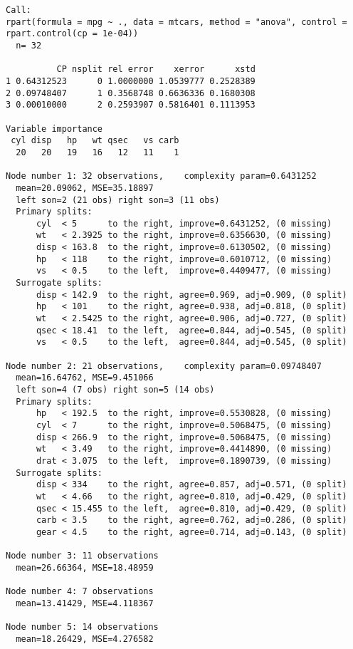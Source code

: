\documentclass[
  letterpaper,
  DIV=11,
  numbers=noendperiod]{scrreprt}
\begin{document}
\begin{verbatim}
Call:
rpart(formula = mpg ~ ., data = mtcars, method = "anova", control = rpart.control(cp = 1e-04))
  n= 32 

          CP nsplit rel error    xerror      xstd
1 0.64312523      0 1.0000000 1.0539777 0.2528389
2 0.09748407      1 0.3568748 0.6636336 0.1680308
3 0.00010000      2 0.2593907 0.5816401 0.1113953

Variable importance
 cyl disp   hp   wt qsec   vs carb 
  20   20   19   16   12   11    1 

Node number 1: 32 observations,    complexity param=0.6431252
  mean=20.09062, MSE=35.18897 
  left son=2 (21 obs) right son=3 (11 obs)
  Primary splits:
      cyl  < 5      to the right, improve=0.6431252, (0 missing)
      wt   < 2.3925 to the right, improve=0.6356630, (0 missing)
      disp < 163.8  to the right, improve=0.6130502, (0 missing)
      hp   < 118    to the right, improve=0.6010712, (0 missing)
      vs   < 0.5    to the left,  improve=0.4409477, (0 missing)
  Surrogate splits:
      disp < 142.9  to the right, agree=0.969, adj=0.909, (0 split)
      hp   < 101    to the right, agree=0.938, adj=0.818, (0 split)
      wt   < 2.5425 to the right, agree=0.906, adj=0.727, (0 split)
      qsec < 18.41  to the left,  agree=0.844, adj=0.545, (0 split)
      vs   < 0.5    to the left,  agree=0.844, adj=0.545, (0 split)

Node number 2: 21 observations,    complexity param=0.09748407
  mean=16.64762, MSE=9.451066 
  left son=4 (7 obs) right son=5 (14 obs)
  Primary splits:
      hp   < 192.5  to the right, improve=0.5530828, (0 missing)
      cyl  < 7      to the right, improve=0.5068475, (0 missing)
      disp < 266.9  to the right, improve=0.5068475, (0 missing)
      wt   < 3.49   to the right, improve=0.4414890, (0 missing)
      drat < 3.075  to the left,  improve=0.1890739, (0 missing)
  Surrogate splits:
      disp < 334    to the right, agree=0.857, adj=0.571, (0 split)
      wt   < 4.66   to the right, agree=0.810, adj=0.429, (0 split)
      qsec < 15.455 to the left,  agree=0.810, adj=0.429, (0 split)
      carb < 3.5    to the right, agree=0.762, adj=0.286, (0 split)
      gear < 4.5    to the right, agree=0.714, adj=0.143, (0 split)

Node number 3: 11 observations
  mean=26.66364, MSE=18.48959 

Node number 4: 7 observations
  mean=13.41429, MSE=4.118367 

Node number 5: 14 observations
  mean=18.26429, MSE=4.276582 
\end{verbatim}
\end{document}
